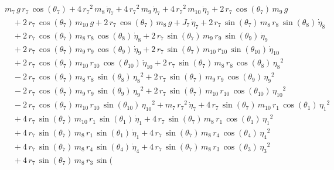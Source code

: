 \begin{eqnarray*} && m_{7}\,g\,r_{7}\,\cos({\theta_{7}}) + 4\,{r_{7}}^
2\,m_{8}\,{\dot{\eta}_{7}} + 4\,{r_{7}}^2\,m_{9}\,{\dot{\eta}_{7}} + 4
\,{r_{7}}^2\,m_{10}\,{\dot{\eta}_{7}} + 2\,r_{7}\,\cos({\theta_{7}})\,
m_{9}\,g \\ &&\quad\mbox{} + 2\,r_{7}\,\cos({\theta_{7}})\,m_{10}\,g
 + 2\,r_{7}\,\cos({\theta_{7}})\,m_{8}\,g + J_{7}\,{\dot{\eta}_{7}} + 
2\,r_{7}\,\sin({\theta_{7}})\,m_{8}\,r_{8}\,\sin({\theta_{8}})\,{
\dot{\eta}_{8}} \\ &&\quad\mbox{} + 2\,r_{7}\,\cos({\theta_{7}})\,m_{8
}\,r_{8}\,\cos({\theta_{8}})\,{\dot{\eta}_{8}} + 2\,r_{7}\,\sin({
\theta_{7}})\,m_{9}\,r_{9}\,\sin({\theta_{9}})\,{\dot{\eta}_{9}}
 \\ &&\quad\mbox{} + 2\,r_{7}\,\cos({\theta_{7}})\,m_{9}\,r_{9}\,\cos(
{\theta_{9}})\,{\dot{\eta}_{9}} + 2\,r_{7}\,\sin({\theta_{7}})\,m_{10}
\,r_{10}\,\sin({\theta_{10}})\,{\dot{\eta}_{10}} \\ &&\quad\mbox{} + 2
\,r_{7}\,\cos({\theta_{7}})\,m_{10}\,r_{10}\,\cos({\theta_{10}})\,{
\dot{\eta}_{10}} + 2\,r_{7}\,\sin({\theta_{7}})\,m_{8}\,r_{8}\,\cos({
\theta_{8}})\,{{\eta_{8}}}^2 \\ &&\quad\mbox{} - 2\,r_{7}\,\cos({
\theta_{7}})\,m_{8}\,r_{8}\,\sin({\theta_{8}})\,{{\eta_{8}}}^2 + 2\,r
_{7}\,\sin({\theta_{7}})\,m_{9}\,r_{9}\,\cos({\theta_{9}})\,{{\eta_{9}
}}^2 \\ &&\quad\mbox{} - 2\,r_{7}\,\cos({\theta_{7}})\,m_{9}\,r_{9}\,
\sin({\theta_{9}})\,{{\eta_{9}}}^2 + 2\,r_{7}\,\sin({\theta_{7}})\,m_{
10}\,r_{10}\,\cos({\theta_{10}})\,{{\eta_{10}}}^2 \\ &&\quad\mbox{} - 
2\,r_{7}\,\cos({\theta_{7}})\,m_{10}\,r_{10}\,\sin({\theta_{10}})\,{{
\eta_{10}}}^2 + m_{7}\,{r_{7}}^2\,{\dot{\eta}_{7}} + 4\,r_{7}\,\sin({
\theta_{7}})\,m_{10}\,r_{1}\,\cos({\theta_{1}})\,{{\eta_{1}}}^2
 \\ &&\quad\mbox{} + 4\,r_{7}\,\sin({\theta_{7}})\,m_{10}\,r_{1}\,\sin
({\theta_{1}})\,{\dot{\eta}_{1}} + 4\,r_{7}\,\sin({\theta_{7}})\,m_{8}
\,r_{1}\,\cos({\theta_{1}})\,{{\eta_{1}}}^2 \\ &&\quad\mbox{} + 4\,r_{
7}\,\sin({\theta_{7}})\,m_{8}\,r_{1}\,\sin({\theta_{1}})\,{\dot{\eta}
_{1}} + 4\,r_{7}\,\sin({\theta_{7}})\,m_{8}\,r_{4}\,\cos({\theta_{4}})
\,{{\eta_{4}}}^2 \\ &&\quad\mbox{} + 4\,r_{7}\,\sin({\theta_{7}})\,m_{
8}\,r_{4}\,\sin({\theta_{4}})\,{\dot{\eta}_{4}} + 4\,r_{7}\,\sin({
\theta_{7}})\,m_{8}\,r_{3}\,\cos({\theta_{3}})\,{{\eta_{3}}}^2
 \\ &&\quad\mbox{} + 4\,r_{7}\,\sin({\theta_{7}})\,m_{8}\,r_{3}\,\sin(

\end{eqnarray*}
